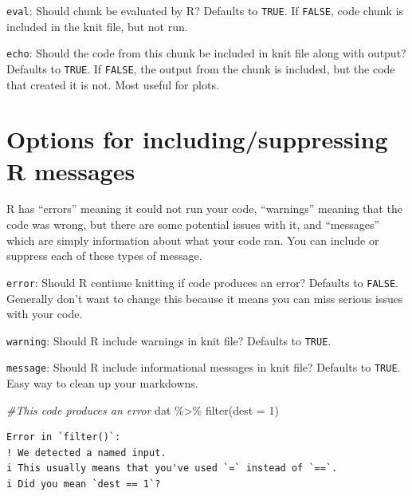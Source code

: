 \documentclass[
  letterpaper,
  DIV=11,
  numbers=noendperiod]{scrreprt}
\newenvironment{Shaded}{}{}
\newcommand{\AttributeTok}[1]{\textcolor[rgb]{0.49,0.56,0.16}{#1}}
\newcommand{\CommentTok}[1]{\textcolor[rgb]{0.38,0.63,0.69}{\textit{#1}}}
\newcommand{\DecValTok}[1]{\textcolor[rgb]{0.25,0.63,0.44}{#1}}
\newcommand{\FunctionTok}[1]{\textcolor[rgb]{0.02,0.16,0.49}{#1}}
\newcommand{\NormalTok}[1]{#1}
\newcommand{\SpecialCharTok}[1]{\textcolor[rgb]{0.25,0.44,0.63}{#1}}
\newcommand{\StringTok}[1]{\textcolor[rgb]{0.25,0.44,0.63}{#1}}
\begin{document}
\texttt{eval}: Should chunk be evaluated by R? Defaults to
\texttt{TRUE}. If \texttt{FALSE}, code chunk is included in the knit
file, but not run.

\texttt{echo}: Should the code from this chunk be included in knit file
along with output? Defaults to \texttt{TRUE}. If \texttt{FALSE}, the
output from the chunk is included, but the code that created it is not.
Most useful for plots.

\section{Options for including/suppressing R
messages}\label{options-for-includingsuppressing-r-messages}

R has ``errors'' meaning it could not run your code, ``warnings''
meaning that the code was wrong, but there are some potential issues
with it, and ``messages'' which are simply information about what your
code ran. You can include or suppress each of these types of message.

\texttt{error}: Should R continue knitting if code produces an error?
Defaults to \texttt{FALSE}. Generally don't want to change this because
it means you can miss serious issues with your code.

\texttt{warning}: Should R include warnings in knit file? Defaults to
\texttt{TRUE}.

\texttt{message}: Should R include informational messages in knit file?
Defaults to \texttt{TRUE}. Easy way to clean up your markdowns.

\begin{Shaded}
\begin{Highlighting}[]
\CommentTok{\#This code produces an error}
\NormalTok{dat }\SpecialCharTok{\%\textgreater{}\%}
  \FunctionTok{filter}\NormalTok{(}\AttributeTok{dest =} \DecValTok{1}\NormalTok{)}
\end{Highlighting}
\end{Shaded}

\begin{verbatim}
Error in `filter()`:
! We detected a named input.
i This usually means that you've used `=` instead of `==`.
i Did you mean `dest == 1`?
\end{verbatim}

\begin{Shaded}
\end{Shaded}
\end{document}
